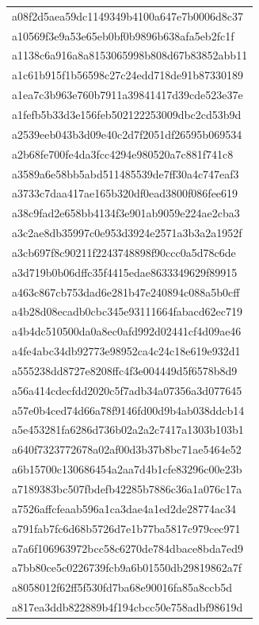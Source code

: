 \begin{tabular}{l}
a08f2d5aea59dc1149349b4100a647e7b0006d8c37 \\
a10569f3e9a53e65eb0bf0b9896b638afa5eb2fc1f \\
a1138c6a916a8a8153065998b808d67b83852abb11 \\
a1c61b915f1b56598c27c24edd718de91b87330189 \\
a1ea7c3b963e760b7911a39841417d39cde523e37e \\
a1fefb5b33d3e156feb502122253009dbc2cd53b9d \\
a2539eeb043b3d09e40c2d7f2051df26595b069534 \\
a2b68fe700fe4da3fcc4294e980520a7c881f741c8 \\
a3589a6e58bb5abd511485539de7ff30a4c747eaf3 \\
a3733c7daa417ae165b320df0ead3800f086fee619 \\
a38c9fad2e658bb4134f3e901ab9059e224ae2cba3 \\
a3c2ae8db35997c0e953d3924e2571a3b3a2a1952f \\
a3cb697f8c90211f2243748898f90ccc0a5d78c6de \\
a3d719b0b06dffc35f4415edae8633349629f89915 \\
a463c867cb753dad6e281b47e240894c088a5b0cff \\
a4b28d08ecadb0cbc345e93111664fabacd62ec719 \\
a4b4dc510500da0a8ec0afd992d02441cf4d09ae46 \\
a4fe4abc34db92773e98952ca4c24c18e619e932d1 \\
a555238dd8727e8208ffc4f3e004449d5f6578b8d9 \\
a56a414cdecfdd2020c5f7adb34a07356a3d077645 \\
a57e0b4ced74d66a78f9146fd00d9b4ab038ddcb14 \\
a5e453281fa6286d736b02a2a2c7417a1303b103b1 \\
a640f7323772678a02af00d3b37b8bc71ae5464e52 \\
a6b15700c130686454a2aa7d4b1cfe83296c00e23b \\
a7189383bc507fbdefb42285b7886c36a1a076c17a \\
a7526affcfeaab596a1ca3dae4a1ed2de28774ac34 \\
a791fab7fc6d68b5726d7e1b77ba5817c979cec971 \\
a7a6f106963972bcc58c6270de784dbace8bda7ed9 \\
a7bb80ce5c0226739fcb9a6b01550db29819862a7f \\
a8058012f62ff5f530fd7ba68e90016fa85a8ccb5d \\
a817ea3ddb822889b4f194cbcc50e758adbf98619d \\

\end{tabular}
